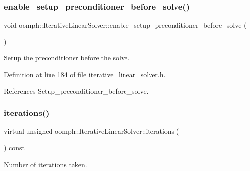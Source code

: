 \subsubsection{\texorpdfstring{enable\+\_\+setup\+\_\+preconditioner\+\_\+before\+\_\+solve()}{enable\_setup\_preconditioner\_before\_solve()}}
{\footnotesize\ttfamily void oomph\+::\+Iterative\+Linear\+Solver\+::enable\+\_\+setup\+\_\+preconditioner\+\_\+before\+\_\+solve (\begin{DoxyParamCaption}{ }\end{DoxyParamCaption})\hspace{0.3cm}{\ttfamily [inline]}}



Setup the preconditioner before the solve. 



Definition at line 184 of file iterative\+\_\+linear\+\_\+solver.\+h.



References Setup\+\_\+preconditioner\+\_\+before\+\_\+solve.

\mbox{\label{classoomph_1_1IterativeLinearSolver_a5fe7f7b5e4847fdbd4f95d3875ec7a46}} 
\subsubsection{\texorpdfstring{iterations()}{iterations()}}
{\footnotesize\ttfamily virtual unsigned oomph\+::\+Iterative\+Linear\+Solver\+::iterations (\begin{DoxyParamCaption}{ }\end{DoxyParamCaption}) const\hspace{0.3cm}{\ttfamily [pure virtual]}}



Number of iterations taken. 



